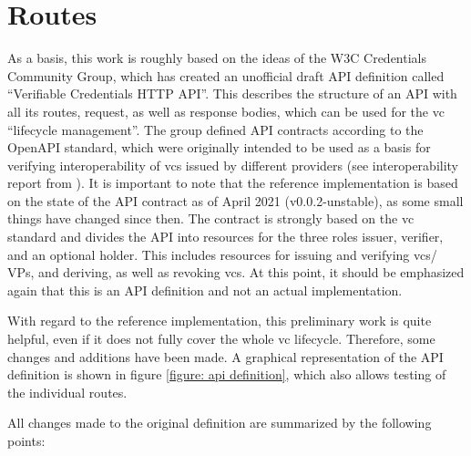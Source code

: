     \section{Routes}
    
    As a basis, this work is roughly based on the ideas of the W3C Credentials Community Group, which has created an unofficial draft API definition called “Verifiable Credentials HTTP API”. This describes the structure of an API with all its routes, request, as well as response bodies, which can be used for the \ac{vc} “lifecycle management”. The group defined API contracts according to the OpenAPI standard, which were originally intended to be used as a basis for verifying interoperability of \acp{vc} issued by different providers (see interoperability report from \cite{homeland_security_preventing_2020}). It is important to note that the reference implementation is based on the state of the API contract as of April 2021 (v0.0.2-unstable), as some small things have changed since then. The contract is strongly based on the \ac{vc} standard and divides the API into resources for the three roles issuer, verifier, and an optional holder. This includes resources for issuing and verifying \acp{vc}/ \acp{VP}, and deriving, as well as revoking \acp{vc}. At this point, it should be emphasized again that this is an API definition and not an actual implementation. \cite{world_wide_web_consortium_credentials_community_group_vc_2021, world_wide_web_consortium_credentials_community_group_verifiable_2021}
    
    With regard to the reference implementation, this preliminary work is quite helpful, even if it does not fully cover the whole \ac{vc} lifecycle. Therefore, some changes and additions have been made. A graphical representation of the API definition is shown in figure \ref{figure: api definition}, which also allows testing of the individual routes.
    
    All changes made to the original definition are summarized by the following points:
    
